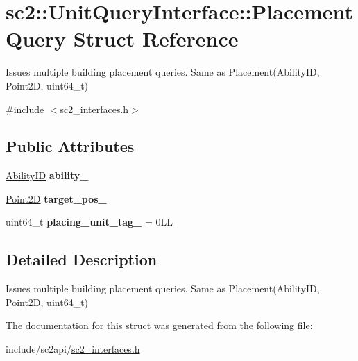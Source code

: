 \hypertarget{structsc2_1_1_unit_query_interface_1_1_placement_query}{}\section{sc2\+:\+:Unit\+Query\+Interface\+:\+:Placement\+Query Struct Reference}
\label{structsc2_1_1_unit_query_interface_1_1_placement_query}


Issues multiple building placement queries. Same as Placement(\+Ability\+I\+D, Point2\+D, uint64\+\_\+t)  




{\ttfamily \#include $<$sc2\+\_\+interfaces.\+h$>$}

\subsection*{Public Attributes}
\begin{DoxyCompactItemize}
\item 
\mbox{\label{structsc2_1_1_unit_query_interface_1_1_placement_query_a529b8f59a8e6cc3988c9ab49480005f2}} 
\hyperlink{classsc2_1_1_s_c2_type}{Ability\+ID} {\bfseries ability\+\_\+}
\item 
\mbox{\label{structsc2_1_1_unit_query_interface_1_1_placement_query_a633c1aee5a2d5ef93bb16e23966d544f}} 
\hyperlink{structsc2_1_1_point2_d}{Point2D} {\bfseries target\+\_\+pos\+\_\+}
\item 
\mbox{\label{structsc2_1_1_unit_query_interface_1_1_placement_query_a1064adfb17a64c4dae8bc5d55a8e1a41}} 
uint64\+\_\+t {\bfseries placing\+\_\+unit\+\_\+tag\+\_\+} = 0\+LL
\end{DoxyCompactItemize}


\subsection{Detailed Description}
Issues multiple building placement queries. Same as Placement(\+Ability\+I\+D, Point2\+D, uint64\+\_\+t) 

The documentation for this struct was generated from the following file\+:\begin{DoxyCompactItemize}
\item 
include/sc2api/\hyperlink{sc2__interfaces_8h}{sc2\+\_\+interfaces.\+h}\end{DoxyCompactItemize}
